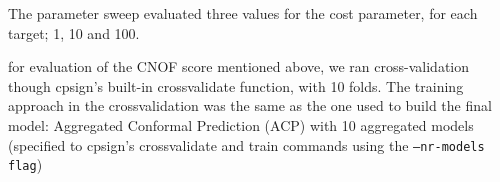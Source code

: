 \documentclass[utf8]{frontiersSCNS} %
\begin{document}
The parameter sweep evaluated three values for the cost parameter, for each
target; 1, 10 and 100.

for evaluation of the CNOF score mentioned above, we ran cross-validation
though cpsign's built-in crossvalidate function, with 10 folds.  The training
approach in the crossvalidation was the same as the one used to build the final
model: Aggregated Conformal Prediction (ACP) with 10 aggregated models
(specified to cpsign's crossvalidate and train commands using the
\texttt{--nr-models flag})


%

\end{document}
